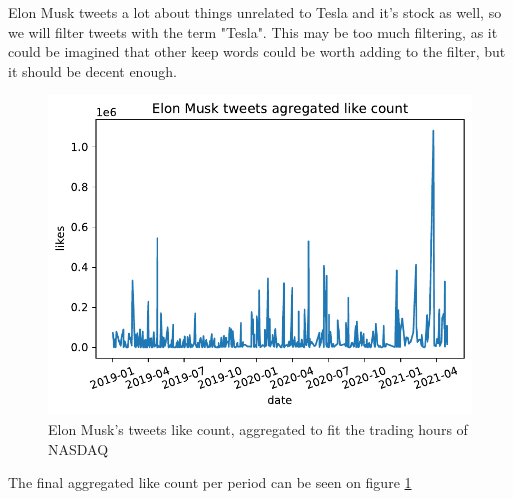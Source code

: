 Elon Musk tweets a lot about things unrelated to Tesla and it's stock as well, so we will filter tweets with the term "Tesla". This may be too much filtering, as it could be imagined that other keep words could be worth adding to the filter, but it should be decent enough.

\begin{figure}[h]
	\centering
	\includegraphics[width=\textwidth]{img/img_agglikes.pdf}
	\caption{Elon Musk's tweets like count, aggregated to fit the trading hours of NASDAQ}
	\label{fig:agglikes}
\end{figure}

The final aggregated like count per period can be seen on figure \ref{fig:agglikes}